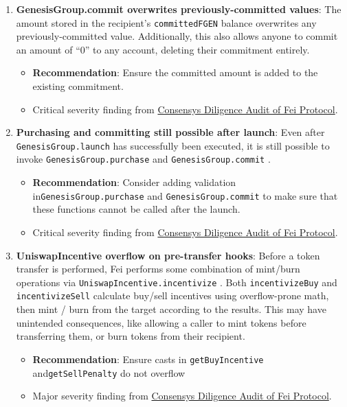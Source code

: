 \begin{enumerate}
\item\textbf{GenesisGroup.commit overwrites previously-committed values}: The amount stored in the recipient’s \verb|committedFGEN|  balance overwrites any previously-committed value. Additionally, this also allows anyone to commit an amount of “0” to any account, deleting their commitment entirely.
	\begin{itemize}
	\item\textbf{Recommendation}: Ensure the committed amount is added to the existing commitment.
	\item Critical severity finding from \href{https://consensys.net/diligence/audits/2021/01/fei-protocol/\#genesisgroup-commit-overwrites-previously-committed-values}{Consensys Diligence Audit of Fei Protocol}.
	\end{itemize}

\item\textbf{Purchasing and committing still possible after launch}: Even after \verb|GenesisGroup.launch|  has successfully been executed, it is still possible to invoke \verb|GenesisGroup.purchase|  and \verb|GenesisGroup.commit| .
	\begin{itemize}
	\item\textbf{Recommendation}: Consider adding validation in\linebreak\verb|GenesisGroup.purchase| and \verb|GenesisGroup.commit| to make sure that these functions cannot be called after the launch.
	\item Critical severity finding from \href{https://consensys.net/diligence/audits/2021/01/fei-protocol/\#purchasing-and-committing-still-possible-after-launch}{Consensys Diligence Audit of Fei Protocol}.
	\end{itemize}

\item\textbf{UniswapIncentive overflow on pre-transfer hooks}: Before a token transfer is performed, Fei performs some combination of mint/burn operations via \verb|UniswapIncentive.incentivize| . Both \verb|incentivizeBuy|  and \verb|incentivizeSell|  calculate buy/sell incentives using overflow-prone math, then mint / burn from the target according to the results. This may have unintended consequences, like allowing a caller to mint tokens before transferring them, or burn tokens from their recipient.
	\begin{itemize}
	\item\textbf{Recommendation}: Ensure casts in \verb|getBuyIncentive| and\linebreak\verb|getSellPenalty| do not overflow
	\item Major severity finding from \href{https://consensys.net/diligence/audits/2021/01/fei-protocol/\#uniswapincentive-overflow-on-pre-transfer-hooks}{Consensys Diligence Audit of Fei Protocol}.
	\end{itemize}


\end{enumerate}
